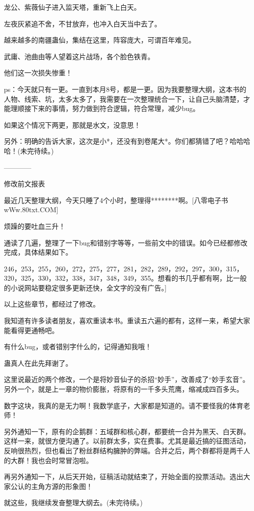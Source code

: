 \begin{this_body}
龙公、紫薇仙子进入监天塔，重新飞上白天。

左夜灰紧追不舍，不甘放弃，也冲入白天当中去了。

越来越多的南疆蛊仙，集结在这里，阵容庞大，可谓百年难见。

武庸、池曲由等人望着这片战场，各个脸色铁青。

他们这一次损失惨重！

ps：今天就只有一更。一直到本月8号，都是一更。因为我要整理大纲，这本书的人物、线索、坑，太多太多了，我需要在一次整理统合一下，让自己头脑清楚，才能理顺接下来的事情，努力做到符合逻辑，符合常理，减少bug。

如果这个情况下两更，那就是水文，没意思！

另外：明确的告诉大家，这次是小*，还没有到卷尾大*。你们都猜错了吧？哈哈哈哈！(未完待续。)

------------

修改前文报表

最近几天整理大纲，今天只睡了4个小时，整理得********啊。[八零电子书wWw.80txt.COM]

烦躁的要吐血三升！

通读了几遍，整理了一下bug和错别字等等，一些前文中的错误。如今已经都修改完成，具体结果如下。

246，253，255，260，272，275，277，281，282，289，292，297，300，315，320，325，330，332，338，347，348，349，355。想看的书几乎都有啊，比一般的小说网站要稳定很多更新还快，全文字的没有广告。]

以上这些章节，都经过了修改。

我知道有许多读者朋友，喜欢重读本书。重读五六遍的都有，这样一来，希望大家能看得更通畅吧。

有什么bug，或者错别字什么的，记得通知我哦！

蛊真人在此先拜谢了。

这里说最近的两个修改，一个是将妙音仙子的杀招“妙手”，改善成了“妙手玄音”。另外一个，就是上一章的物价膨胀，将原有的一千多头荒鹰，缩减成四百多头。

数字这块，我真的是无力啊！我数学底子，大家都是知道的。请不要怪我的体育老师！

另外通知一下，原有的企鹅群：五域群和核心群，都要统一合并为黑天、白天群。这样一来，就很方便沟通了。以前群太多，实在费事。尤其是最近搞的征图活动，反响很热烈，但也看出了粉丝群结构臃肿的弊端。合并之后，两个群都将是两千人的大群！我也会时常冒泡啦。

再另外通知一下，从后天开始，征稿活动就结束了，开始全面的投票活动。选出大家公认的主角方源的形象图！

就这些，我继续发奋整理大纲去。(未完待续。)

\end{this_body}

